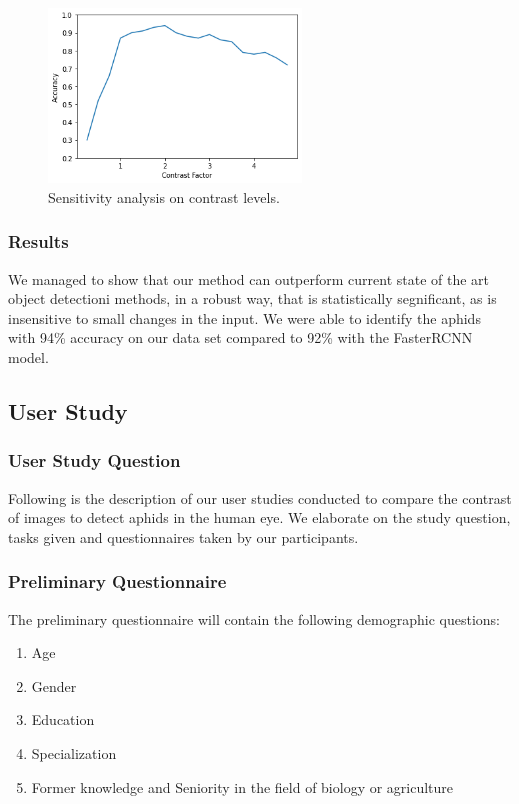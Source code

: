 \documentclass{article}
\begin{document}
\begin{figure}[h]
    \centering
    \includegraphics[width=0.6\textwidth]{images/sensitivity.png}
    \caption{Sensitivity analysis on contrast levels.}
    \label{fig:sensitivity}
\end{figure}

\subsubsection{Results}
We managed to show that our method can outperform current state of the art object detectioni methods,
in a robust way, that is statistically segnificant, as is insensitive to small changes in the input.
We were able to identify the aphids with 94\% accuracy on our data set compared to 92\% with the FasterRCNN model.

\newpage
\subsection{User Study}

\subsubsection{User Study Question}
Following is the description of our user studies conducted to compare the contrast of images to detect aphids in the human eye. We elaborate on the study question, tasks given and questionnaires taken by our participants.
\subsubsection{Preliminary Questionnaire}
The preliminary questionnaire will contain the following demographic questions: 

\begin{enumerate}
    \item Age
    \item Gender
    \item Education
    \item Specialization
    \item Former knowledge and Seniority in the field of biology or agriculture
\end{enumerate}
\end{document}

